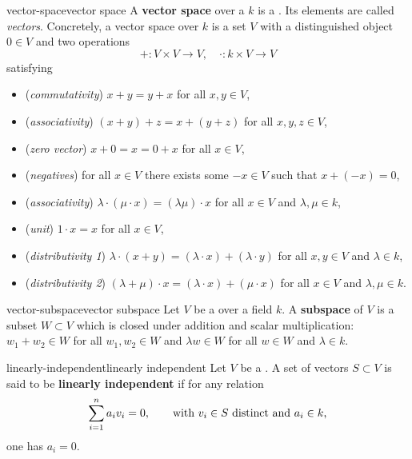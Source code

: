 \begin{topic}{vector-space}{vector space}
    A \textbf{vector space} over a  $k$ is a . Its elements are called \textit{vectors}.
    Concretely, a vector space over $k$ is a set $V$ with a distinguished object $0 \in V$ and two operations
    \[ + : V \times V \to V, \quad \cdot : k \times V \to V \]
    satisfying
    \begin{itemize}
        \item (\textit{commutativity}) $x + y = y + x$ for all $x, y \in V$,
        \item (\textit{associativity}) $(x + y) + z = x + (y + z)$ for all $x, y, z \in V$,
        \item (\textit{zero vector}) $x + 0 = x = 0 + x$ for all $x \in V$,
        \item (\textit{negatives}) for all $x \in V$ there exists some $-x \in V$ such that $x + (-x) = 0$,
        \item (\textit{associativity}) $\lambda \cdot (\mu \cdot x) = (\lambda \mu) \cdot x$ for all $x \in V$ and $\lambda, \mu \in k$,
        \item (\textit{unit}) $1 \cdot x = x$ for all $x \in V$,
        \item (\textit{distributivity 1}) $\lambda \cdot (x + y) = (\lambda \cdot x) + (\lambda \cdot y)$ for all $x, y \in V$ and $\lambda \in k$,
        \item (\textit{distributivity 2}) $(\lambda + \mu) \cdot x = (\lambda \cdot x) + (\mu \cdot x)$ for all $x \in V$ and $\lambda, \mu \in k$.
    \end{itemize}
\end{topic}

\begin{topic}{vector-subspace}{vector subspace}
    Let $V$ be a  over a field $k$. A \textbf{subspace} of $V$ is a subset $W \subset V$ which is closed under addition and scalar multiplication: $w_1 + w_2 \in W$ for all $w_1, w_2 \in W$ and $\lambda w \in W$ for all $w \in W$ and $\lambda \in k$.
\end{topic}

\begin{topic}{linearly-independent}{linearly independent}
    Let $V$ be a . A set of vectors $S \subset V$ is said to be \textbf{linearly independent} if for any relation
    \[ \sum_{i = 1}^{n} a_i v_i = 0, \qquad \textup{with $v_i \in S$ distinct and $a_i \in k$,} \]
    one has $a_i = 0$.
\end{topic}

